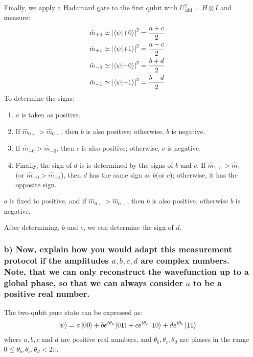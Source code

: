 \documentclass[a4paper, 11pt]{article}
\begin{document}
Finally, we apply a Hadamard gate to the first qubit with $U_{\text{add}}^{2} = H \otimes I$ and measure:
\begin{align}
  \hat{m}_{+0} &\simeq \left| \bra{\psi}\ket{+0} \right|^2 = \frac{a+c}{2} \\ 
  \hat{m}_{+1} &\simeq \left| \bra{\psi}\ket{+1} \right|^2 = \frac{a-c}{2} \\ 
  \hat{m}_{-0} &\simeq \left| \bra{\psi}\ket{-0} \right|^2 = \frac{b+d}{2} \\ 
  \hat{m}_{-1} &\simeq \left| \bra{\psi}\ket{-1} \right|^2 = \frac{b-d}{2}  
\end{align}
To determine the signs:
\begin{enumerate}
  \item $a$ is taken as positive.
  \item If $\hat{m}_{0+} > \hat{m}_{0-}$, then $b$ is also positive; otherwise, $b$ is negative.
  \item If $\hat{m}_{+0} > \hat{m}_{-0}$, then $c$ is also positive; otherwise, $c$ is negative.
  \item Finally, the sign of $d$ is is determined by the signs of $b$ and $c$. If $\hat{m}_{1+} > \hat{m}_{1-}$(or $\hat{m}_{-0} > \hat{m}_{-1}$), then $d$ has the same sign as $b$(or $c$); otherwise, it has the opposite sign.
\end{enumerate}
$a$ is fixed to positive, and if $\hat{m}_{0+} > \hat{m}_{0-}$, then $b$ is also positive, otherwise $b$ is negative.

After determining, $b$ and $c$, we can determine the sign of $d$. 




\subsubsection*{b) Now, explain how you would adapt this measurement protocol if the amplitudes $a,b,c,d$ are complex numbers. Note, that we can only reconstruct the wavefunction up to a global phase, so that we can always consider $a$ to be a positive real number.}

The two-qubit pure state can be expressed as:
\begin{equation}
  \ket{\psi} = a\ket{00} + b e^{i\theta_{b}} \ket{01} + c e^{i\theta_{c}} \ket{10} + d e^{i\theta_{b}} \ket{11}
\end{equation}
where $a, b, c$ and $d$ are positive real numbers, and $\theta_b , \theta_c , \theta_d$ are phases in the range $0 \le \theta_{b} , \theta_{c} , \theta_{d} <2\pi $.
\end{document}
